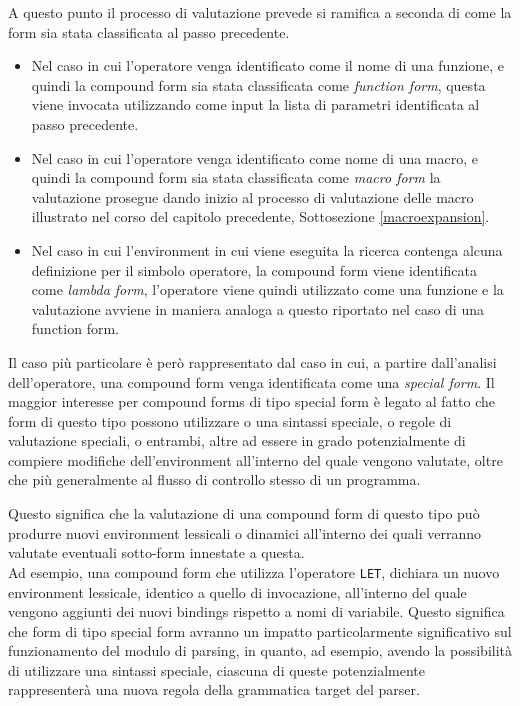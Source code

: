 A questo punto il processo di valutazione prevede si ramifica a seconda di
come la form sia stata classificata al passo precedente.

\begin{itemize}

\item Nel caso in cui l’operatore venga identificato come il nome di una
funzione, e quindi la compound form sia stata classificata come
\textit{function form}, questa viene invocata utilizzando come input la lista
di parametri identificata al passo precedente.

\item Nel caso in cui l’operatore venga identificato come nome di una macro, e
quindi la compound form sia stata classificata come \textit{macro form} la
valutazione prosegue dando inizio al processo di valutazione delle macro
illustrato nel corso del capitolo precedente, Sottosezione \ref{macroexpansion}.

\item Nel caso in cui l’environment in cui viene eseguita la ricerca contenga
alcuna definizione per il simbolo operatore, la compound form viene
identificata come \textit{lambda form}, l’operatore viene quindi utilizzato
come una funzione e la valutazione avviene in maniera analoga a questo
riportato nel caso di una function form.

\end{itemize}

Il caso più particolare è però rappresentato dal caso in cui, a partire
dall’analisi dell’operatore, una compound form venga identificata come una
\textit{special form}. Il maggior interesse per compound forms di tipo special
form è legato al fatto che form di questo tipo possono utilizzare o una
sintassi speciale, o regole di valutazione speciali, o entrambi, altre ad
essere in grado potenzialmente di compiere modifiche dell’environment
all’interno del quale vengono valutate, oltre che più generalmente al flusso
di controllo stesso di un programma.

Questo significa che la valutazione di una compound form di questo tipo può
produrre nuovi environment lessicali o dinamici all’interno dei quali verranno
valutate eventuali sotto-form innestate a questa.\\

Ad esempio, una compound form che utilizza l’operatore \texttt{LET}, dichiara
un nuovo environment lessicale, identico a quello di invocazione, all’interno
del quale vengono aggiunti dei nuovi bindings rispetto a nomi di variabile.
Questo significa che form di tipo special form avranno un impatto
particolarmente significativo sul funzionamento del modulo di parsing, in
quanto, ad esempio, avendo la possibilità di utilizzare una sintassi speciale,
ciascuna di queste potenzialmente rappresenterà una nuova regola della
grammatica target del parser.\\

